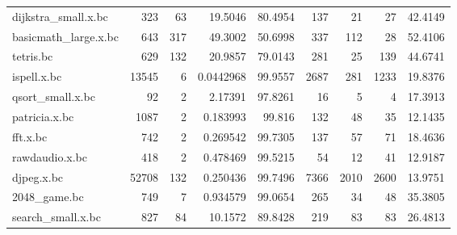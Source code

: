 \begin{tabular}{lrrrrrrrr}
 dijkstra\_small.x.bc  &           323 &                  63 &     19.5046    &       80.4954 &                137 &                               21 &                          27 &       42.4149  \\
 basicmath\_large.x.bc &           643 &                 317 &     49.3002    &       50.6998 &                337 &                              112 &                          28 &       52.4106  \\
 tetris.bc            &           629 &                 132 &     20.9857    &       79.0143 &                281 &                               25 &                         139 &       44.6741  \\
 ispell.x.bc          &         13545 &                   6 &      0.0442968 &       99.9557 &               2687 &                              281 &                        1233 &       19.8376  \\
 qsort\_small.x.bc     &            92 &                   2 &      2.17391   &       97.8261 &                 16 &                                5 &                           4 &       17.3913  \\
 patricia.x.bc        &          1087 &                   2 &      0.183993  &       99.816  &                132 &                               48 &                          35 &       12.1435  \\
 fft.x.bc             &           742 &                   2 &      0.269542  &       99.7305 &                137 &                               57 &                          71 &       18.4636  \\
 rawdaudio.x.bc       &           418 &                   2 &      0.478469  &       99.5215 &                 54 &                               12 &                          41 &       12.9187  \\
 djpeg.x.bc           &         52708 &                 132 &      0.250436  &       99.7496 &               7366 &                             2010 &                        2600 &       13.9751  \\
 2048\_game.bc         &           749 &                   7 &      0.934579  &       99.0654 &                265 &                               34 &                          48 &       35.3805  \\
 search\_small.x.bc    &           827 &                  84 &     10.1572    &       89.8428 &                219 &                               83 &                          83 &       26.4813  \\

\end{tabular}
